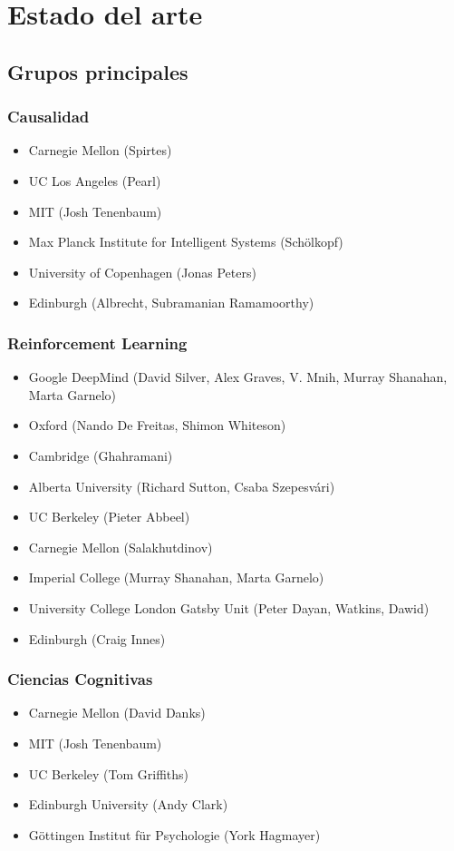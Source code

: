 \documentclass[11pt]{article}
\theoremstyle{plain}
\begin{document}
\section{Estado del arte}
\subsection{Grupos principales}
\subsubsection{Causalidad}
\begin{itemize}
\item Carnegie Mellon (Spirtes)
\item UC Los Angeles (Pearl)
\item MIT (Josh Tenenbaum)
\item Max Planck Institute for Intelligent Systems (Schölkopf)
\item University of Copenhagen  (Jonas Peters)
\item Edinburgh (Albrecht, Subramanian Ramamoorthy)
\end{itemize}
\subsubsection{Reinforcement Learning}
\begin{itemize}
\item Google DeepMind (David Silver, Alex Graves, V. Mnih, Murray Shanahan, Marta Garnelo)
\item Oxford (Nando De Freitas, Shimon Whiteson)
\item Cambridge (Ghahramani)
\item  Alberta University (Richard Sutton, Csaba Szepesvári)
\item UC Berkeley (Pieter Abbeel)
\item Carnegie Mellon (Salakhutdinov)
\item Imperial College (Murray Shanahan, Marta Garnelo)
\item University College London Gatsby Unit (Peter Dayan, Watkins, Dawid)
\item Edinburgh (Craig Innes)
\end{itemize}
\subsubsection{Ciencias Cognitivas}
\begin{itemize}
\item Carnegie Mellon (David Danks)
\item MIT (Josh Tenenbaum)
\item UC Berkeley (Tom Griffiths)
\item Edinburgh University (Andy Clark)
\item Göttingen Institut für Psychologie (York Hagmayer)
\end{itemize}
\newpage


\end{document}
